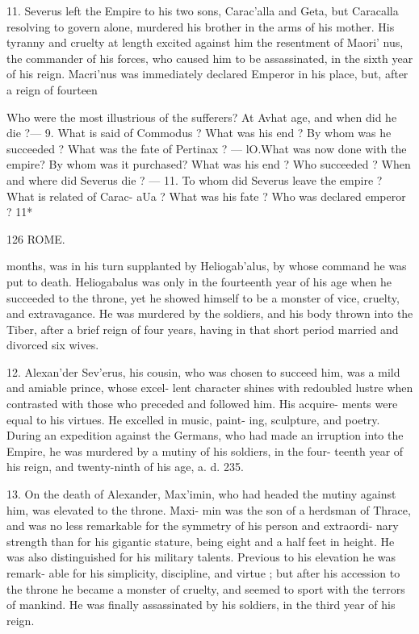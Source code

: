 \documentclass[openany,a4paper]{memoir}
\begin{document}
11. Severus left the Empire to his two sons, Carac'alla and 
Geta, but Caracalla resolving to govern alone, murdered his 
brother in the arms of his mother. His tyranny and cruelty 
at length excited against him the resentment of Maori' nus, the 
commander of his forces, who caused him to be assassinated, 
in the sixth year of his reign. Macri'nus was immediately 
declared Emperor in his place, but, after a reign of fourteen 

Who were the most illustrious of the sufferers? At Avhat age, and 
when did he die ?— 9. What is said of Commodus ? What was his end ? 
By whom was he succeeded ? What was the fate of Pertinax ? — lO.What 
was now done with the empire? By whom was it purchased? What 
was his end ? Who succeeded ? When and where did Severus die ? — 
11. To whom did Severus leave the empire ? What is related of Carac- 
aUa ? What was his fate ? Who was declared emperor ? 
11* 



126 ROME. 

months, was in his turn supplanted by Heliogab'alus, by 
whose command he was put to death. Heliogabalus was 
only in the fourteenth year of his age when he succeeded to 
the throne, yet he showed himself to be a monster of vice, 
cruelty, and extravagance. He was murdered by the soldiers, 
and his body thrown into the Tiber, after a brief reign of 
four years, having in that short period married and divorced 
six wives. 

12. Alexan'der Sev'erus, his cousin, who was chosen to 
succeed him, was a mild and amiable prince, whose excel- 
lent character shines with redoubled lustre when contrasted 
with those who preceded and followed him. His acquire- 
ments were equal to his virtues. He excelled in music, paint- 
ing, sculpture, and poetry. During an expedition against 
the Germans, who had made an irruption into the Empire, 
he was murdered by a mutiny of his soldiers, in the four- 
teenth year of his reign, and twenty-ninth of his age, a. d. 
235. 

13. On the death of Alexander, Max'imin, who had headed 
the mutiny against him, was elevated to the throne. Maxi- 
min was the son of a herdsman of Thrace, and was no less 
remarkable for the symmetry of his person and extraordi- 
nary strength than for his gigantic stature, being eight and 
a half feet in height. He was also distinguished for his 
military talents. Previous to his elevation he was remark- 
able for his simplicity, discipline, and virtue ; but after his 
accession to the throne he became a monster of cruelty, 
and seemed to sport with the terrors of mankind. He was 
finally assassinated by his soldiers, in the third year of his 
reign. 
\end{document}
